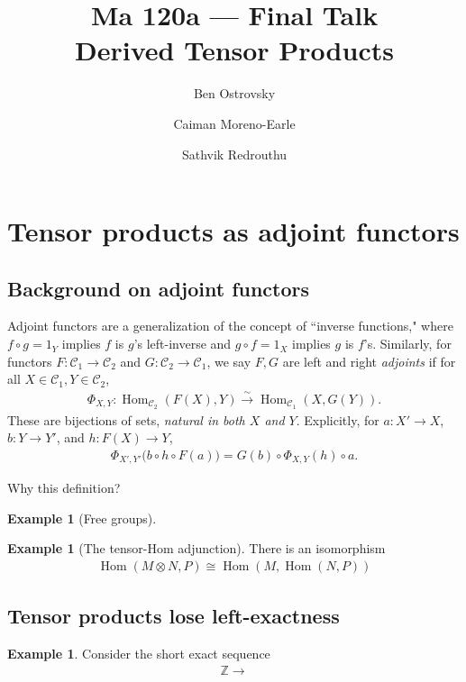 \documentclass[11pt]{article}
\title{Ma 120a --- Final Talk\\Derived Tensor Products}
\author{Ben Ostrovsky \and Caiman Moreno-Earle \and Sathvik Redrouthu}
\date{}
\theoremstyle{plain}
\theoremstyle{definition}
\newtheorem{example}[theorem]{Example}
\theoremstyle{remark}
\DeclareMathOperator{\Hom}{Hom}
\begin{document}
\maketitle

\tableofcontents

\section{Tensor products as adjoint functors}

\subsection{Background on adjoint functors}

Adjoint functors are a generalization of the concept of ``inverse functions," where $f\circ g=1_Y$ implies $f$ is $g$'s left-inverse and $g\circ f=1_X$ implies $g$ is $f$'s. Similarly, for functors $F:\mathcal{C}_1\to\mathcal{C}_2$ and $G:\mathcal{C}_2\to\mathcal{C}_1$, we say $F,G$ are left and right \emph{adjoints} if for all $X\in\mathcal{C}_1,Y\in\mathcal{C}_2$,
\begin{align*}
    \Phi_{X,Y}:\Hom_{\mathcal{C}_2}(F(X),Y)
        \xrightarrow{\sim}\Hom_{\mathcal{C}_1}(X,G(Y)).
\end{align*}
These are bijections of sets, \emph{natural in both $X$ and $Y$}.
Explicitly, for $a:X'\to X$, $b:Y\to Y'$, and $h:F(X)\to Y$,
\begin{align*}
    \Phi_{X',Y'}\bigl(b\circ h\circ F(a)\bigr)
        =G(b)\circ\Phi_{X,Y}(h)\circ a.
\end{align*}

Why this definition?


\begin{example}[Free groups]
    
\end{example}
\begin{example}[The tensor-Hom adjunction]
There is an isomorphism 
\begin{align*}
    \Hom(M\otimes N, P)\cong \Hom(M,\Hom(N,P))
\end{align*}
    
\end{example}
\subsection{Tensor products lose left-exactness}

\begin{example}
    Consider the short exact sequence 
    \begin{align*}
        \mathbb{Z}\longrightarrow
    \end{align*}
\end{example}
\end{document}
